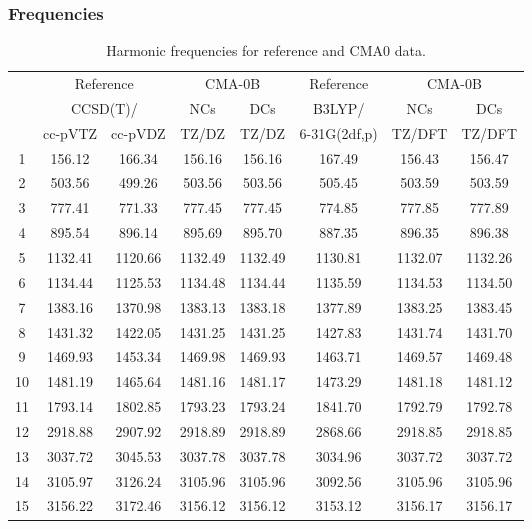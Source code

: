 \documentclass[10pt,oneside]{article}
\begin{document}
\clearpage

\subsubsection*{Frequencies}
\begin{table}[h!]
\centering
\caption{Harmonic frequencies for reference and CMA0 data.}
\begin{tabular}{cccccccc}
\toprule
{} & \multicolumn{2}{c}{Reference} & \multicolumn{2}{c}{CMA-0B} &    Reference & \multicolumn{2}{c}{CMA-0B} \\
{} & \multicolumn{2}{c}{CCSD(T)/} &     NCs &     DCs &       B3LYP/ &     NCs &     DCs \\
{} &   cc-pVTZ & cc-pVDZ &   TZ/DZ &   TZ/DZ & 6-31G(2df,p) &  TZ/DFT &  TZ/DFT \\
\midrule
1  &    156.12 &  166.34 &  156.16 &  156.16 &       167.49 &  156.43 &  156.47 \\
2  &    503.56 &  499.26 &  503.56 &  503.56 &       505.45 &  503.59 &  503.59 \\
3  &    777.41 &  771.33 &  777.45 &  777.45 &       774.85 &  777.85 &  777.89 \\
4  &    895.54 &  896.14 &  895.69 &  895.70 &       887.35 &  896.35 &  896.38 \\
5  &   1132.41 & 1120.66 & 1132.49 & 1132.49 &      1130.81 & 1132.07 & 1132.26 \\
6  &   1134.44 & 1125.53 & 1134.48 & 1134.44 &      1135.59 & 1134.53 & 1134.50 \\
7  &   1383.16 & 1370.98 & 1383.13 & 1383.18 &      1377.89 & 1383.25 & 1383.45 \\
8  &   1431.32 & 1422.05 & 1431.25 & 1431.25 &      1427.83 & 1431.74 & 1431.70 \\
9  &   1469.93 & 1453.34 & 1469.98 & 1469.93 &      1463.71 & 1469.57 & 1469.48 \\
10 &   1481.19 & 1465.64 & 1481.16 & 1481.17 &      1473.29 & 1481.18 & 1481.12 \\
11 &   1793.14 & 1802.85 & 1793.23 & 1793.24 &      1841.70 & 1792.79 & 1792.78 \\
12 &   2918.88 & 2907.92 & 2918.89 & 2918.89 &      2868.66 & 2918.85 & 2918.85 \\
13 &   3037.72 & 3045.53 & 3037.78 & 3037.78 &      3034.96 & 3037.72 & 3037.72 \\
14 &   3105.97 & 3126.24 & 3105.96 & 3105.96 &      3092.56 & 3105.96 & 3105.96 \\
15 &   3156.22 & 3172.46 & 3156.12 & 3156.12 &      3153.12 & 3156.17 & 3156.17 \\
\bottomrule
\end{tabular}
\end{table}
\end{document}
